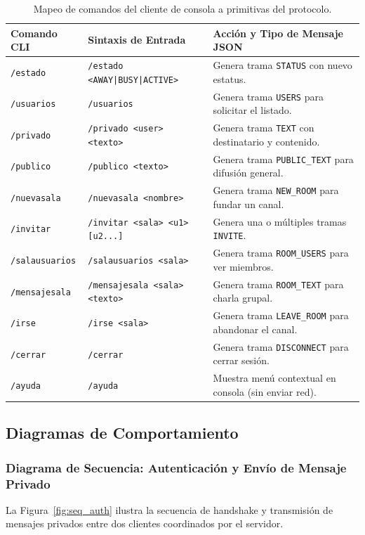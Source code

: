 \documentclass[12pt,a4paper]{article}
\begin{document}
\begin{table}[htbp]
\centering
\footnotesize
\renewcommand{\arraystretch}{0.92}
\begin{tabularx}{\textwidth}{l p{3.8cm} X}
\toprule
\textbf{Comando CLI} & \textbf{Sintaxis de Entrada} & \textbf{Acción y Tipo de Mensaje JSON} \\
\midrule
\texttt{/estado} & \texttt{/estado <AWAY|BUSY|ACTIVE>} & Genera trama \texttt{STATUS} con nuevo estatus. \\
\texttt{/usuarios} & \texttt{/usuarios} & Genera trama \texttt{USERS} para solicitar el listado. \\
\texttt{/privado} & \texttt{/privado <user> <texto>} & Genera trama \texttt{TEXT} con destinatario y contenido. \\
\texttt{/publico} & \texttt{/publico <texto>} & Genera trama \texttt{PUBLIC\_TEXT} para difusión general. \\
\texttt{/nuevasala} & \texttt{/nuevasala <nombre>} & Genera trama \texttt{NEW\_ROOM} para fundar un canal. \\
\texttt{/invitar} & \texttt{/invitar <sala> <u1> [u2...]} & Genera una o múltiples tramas \texttt{INVITE}. \\
\texttt{/salausuarios} & \texttt{/salausuarios <sala>} & Genera trama \texttt{ROOM\_USERS} para ver miembros. \\
\texttt{/mensajesala} & \texttt{/mensajesala <sala> <texto>} & Genera trama \texttt{ROOM\_TEXT} para charla grupal. \\
\texttt{/irse} & \texttt{/irse <sala>} & Genera trama \texttt{LEAVE\_ROOM} para abandonar el canal. \\
\texttt{/cerrar} & \texttt{/cerrar} & Genera trama \texttt{DISCONNECT} para cerrar sesión. \\
\texttt{/ayuda} & \texttt{/ayuda} & Muestra menú contextual en consola (sin enviar red). \\
\bottomrule
\end{tabularx}
\caption{Mapeo de comandos del cliente de consola a primitivas del protocolo.}
\label{tab:cli_commands}
\end{table}

\subsection{Diagramas de Comportamiento}

\subsubsection{Diagrama de Secuencia: Autenticación y Envío de Mensaje Privado}
La Figura~\ref{fig:seq_auth} ilustra la secuencia de handshake y transmisión de mensajes privados entre dos clientes coordinados por el servidor.
\end{document}
